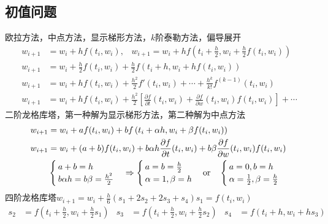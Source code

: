 \documentclass[twocolumn]{article}
\begin{document}
\subsection{初值问题}
欧拉方法，中点方法，显示梯形方法，$k$阶泰勒方法，偏导展开
\begin{align*}
    w_{i+1} & =w_i+hf(t_i,w_i),\,\,\,\,\, w_{i+1}=w_i+hf\left(t_i+\frac{h}{2},w_i+\frac{h}{2}f(t_i,w_i)\right)                                            \\
    w_{i+1} & =w_{i}+\frac{h}{2}f(t_i,w_i)+\frac{h}{2}f\left(t_i+h,w_i+hf(t_i,w_i)\right)                                                                 \\
    w_{i+1} & =w_i+hf(t_i,w_i)+\frac{h^2}{2}f'(t_i,w_i)+\cdots+\frac{h^k}{k!}f^{(k-1)}(t_i,w_i)                                                           \\
    w_{i+1} & =w_i+hf(t_i,w_i)+\frac{h^2}{2}\left[ \frac{\partial f}{\partial t}(t_i,w_i)+\frac{\partial f}{\partial w}(t_i,w_i)f(t_i,w_i) \right]+\cdots
\end{align*}
二阶龙格库塔，第一种解为显示梯形方法，第二种解为中点方法
\begin{align*}
    w_{i+1} & =w_i+af(t_i,w_i)+bf\left(t_i+\alpha h,w_i+\beta f(t_i,w_i)\right)                                                           \\
    w_{i+1} & =w_i+(a+b)f(t_i,w_i)+b\alpha h\frac{\partial f}{\partial t}(t_i,w_i)+b\beta\frac{\partial f}{\partial w}(t_i,w_i)f(t_i,w_i) \\
            &
    \begin{cases}
        a+b=h \\
        b\alpha h=b\beta=\frac{h^2}{2}
    \end{cases}
    \Rightarrow
    \begin{cases}
        a=b=\frac{h}{2} \\
        \alpha=1,\beta=h
    \end{cases}
    \text{or\quad}
    \begin{cases}
        a=0,b=h \\
        \alpha=\frac{1}{2},\beta=\frac{h}{2}
    \end{cases}
\end{align*}
四阶龙格库塔\qquad$w_{i+1}=w_i+\frac{h}{6}(s_1+2s_2+2s_3+s_4)$\qquad$s_1=f(t_i,w_i)$
\begin{align*}
    s_2 & =f\left( t_i+\frac{h}{2},w_i+\frac{h}{2}s_1 \right) & s_3 & =f\left( t_i+\frac{h}{2},w_i+\frac{h}{2}s_2 \right) & s_4 & =f\left( t_i+h,w_i+hs_3 \right)
\end{align*}
\end{document}
